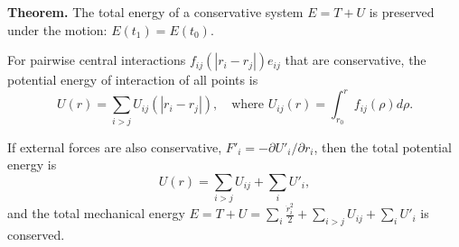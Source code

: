 \textbf{Theorem.} The total energy of a conservative system $E = T + U$ is preserved under the motion: $E(t_1) = E(t_0)$.

For pairwise central interactions $f_{ij}(|r_i - r_j|) e_{ij}$ that are conservative, the potential energy of interaction of all points is
$$U(r) = \sum_{i>j} U_{ij}(|r_i - r_j|), \quad \text{where } U_{ij}(r) = \int_{r_0}^{r} f_{ij}(\rho) d\rho.$$

If external forces are also conservative, $F'_i = -\partial U'_i/\partial r_i$, then the total potential energy is
$$U(r) = \sum_{i>j} U_{ij} + \sum_i U'_i,$$
and the total mechanical energy $E = T + U = \sum_i \frac{\dot{r}_i^2}{2} + \sum_{i>j} U_{ij} + \sum_i U'_i$ is conserved.
